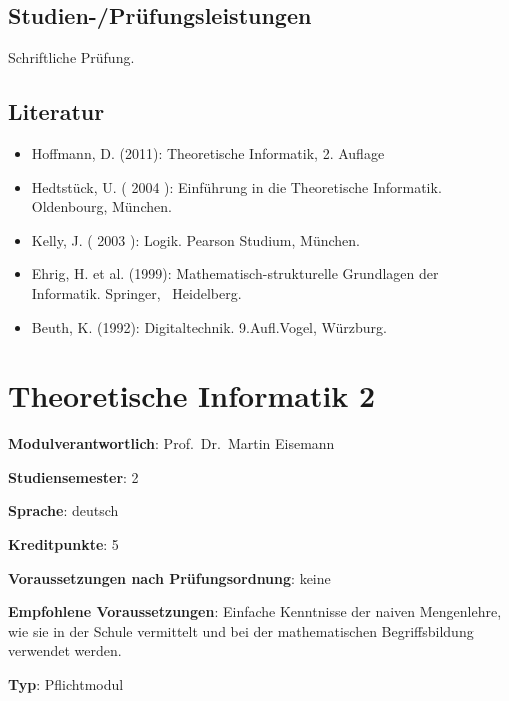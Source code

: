 \section*{Studien-/Prüfungsleistungen\label{/mi-2017/modulbeschreibungen-bachelor/BA_TheoretischeInformatik1}}\label{studien-pruxfcfungsleistungenpathlabelmi-2017modulbeschreibungen-bachelorbaux5ftheoretischeinformatik1}

Schriftliche Prüfung.

\section*{Literatur\label{/mi-2017/modulbeschreibungen-bachelor/BA_TheoretischeInformatik1}}\label{literaturpathlabelmi-2017modulbeschreibungen-bachelorbaux5ftheoretischeinformatik1}

\begin{itemize}
\tightlist
\item
  Hoffmann, D. (2011): Theoretische Informatik, 2. Auflage
\item
  Hedtstück, U. ( 2004 ): Einführung in die Theoretische Informatik.
  Oldenbourg, München.
\item
  Kelly, J. ( 2003 ): Logik. Pearson Studium, München.
\item
  Ehrig, H. et al. (1999): Mathematisch-strukturelle Grundlagen der
  Informatik. Springer,~ Heidelberg.
\item
  Beuth, K. (1992): Digitaltechnik. 9.Aufl.Vogel, Würzburg.
\end{itemize}

\chapter{Theoretische Informatik
2\label{/mi-2017/modulbeschreibungen-bachelor/BA_TheoretischeInformatik2}}\label{theoretische-informatik-2pathlabelmi-2017modulbeschreibungen-bachelorbaux5ftheoretischeinformatik2}

\begin{modulHead}
\textbf{Modulverantwortlich}: Prof.~Dr.~Martin
Eisemann
\end{modulHead}
\begin{modulHead}
\textbf{Studiensemester}:
2
\end{modulHead}
\begin{modulHead}
\textbf{Sprache}:
deutsch
\end{modulHead}
\begin{modulHead}
\textbf{Kreditpunkte}:
5
\end{modulHead}
\begin{modulHead}
\textbf{Voraussetzungen nach
Prüfungsordnung}:
keine
\end{modulHead}
\begin{modulHead}
\textbf{Empfohlene
Voraussetzungen}: Einfache Kenntnisse der naiven Mengenlehre, wie sie in
der Schule vermittelt und bei der mathematischen Begriffsbildung
verwendet werden.
\end{modulHead}
\begin{modulHead}
\textbf{Typ}:
Pflichtmodul
\end{modulHead}


